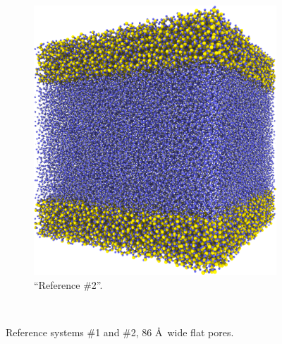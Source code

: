 \begin{figure}[!p]
{\begin{subfigure}[t]{\myfigwidth}
            \includegraphics[width=\textwidth]{images/systems/trimmed-flat_square_fracture03_04}%
            \caption{``Reference \#2''.}%
            \label{fig:renderings_flat_square_fracture03}%
        \end{subfigure}%
    }%
    \vspace{10pt}\\%
    \caption{%
        Reference systems \#1 and \#2, 86 \AA\ wide flat pores.%
        \label{fig:renderings_flat_fractures01}%
    }%
\end{figure}%



